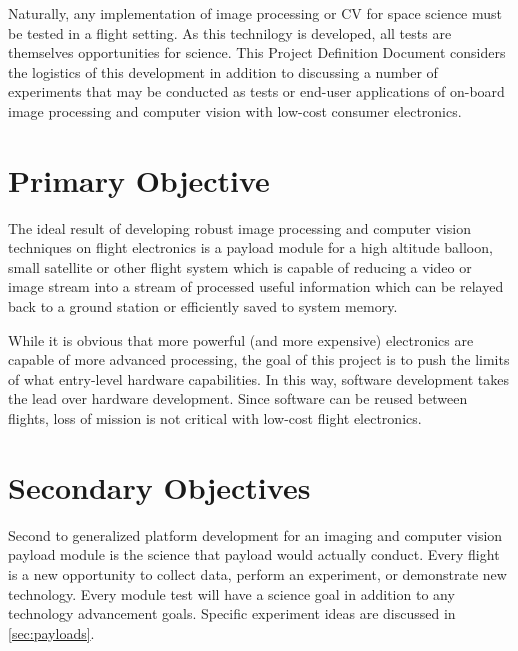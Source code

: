 \documentclass[conference]{IEEEtran} %
\begin{document}
Naturally, any implementation of image processing or CV for space science must be tested in a flight setting.
As this technilogy is developed, all tests are themselves opportunities for science.
This Project Definition Document considers the logistics of this development in addition to discussing a number of experiments that may be conducted as tests or end-user applications of on-board image processing and computer vision with low-cost consumer electronics.

\section{Primary Objective}
\label{sec:primary-obj}

The ideal result of developing robust image processing and computer vision techniques on flight electronics is a payload module for a high altitude balloon, small satellite or other flight system which is capable of reducing a video or image stream into a stream of processed useful information which can be relayed back to a ground station or efficiently saved to system memory.

While it is obvious that more powerful (and more expensive) electronics are capable of more advanced processing, the goal of this project is to push the limits of what entry-level hardware capabilities.
In this way, software development takes the lead over hardware development.
Since software can be reused between flights, loss of mission is not critical with low-cost flight electronics.

\section{Secondary Objectives}
\label{sec:secondary-obj}
Second to generalized platform development for an imaging and computer vision payload module is the science that payload would actually conduct.
Every flight is a new opportunity to collect data, perform an experiment, or demonstrate new technology.
Every module test will have a science goal in addition to any technology advancement goals.
Specific experiment ideas are discussed in \autoref{sec:payloads}.
\end{document}
